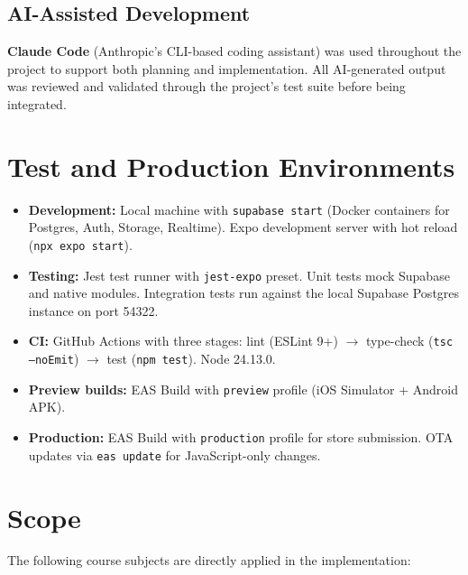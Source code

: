 \documentclass[12pt,a4paper]{report}
\renewcommand\_{\textunderscore\hspace{0pt}}
\begin{document}
\subsection{AI-Assisted Development}

\textbf{Claude Code} (Anthropic's CLI-based coding assistant) was used throughout the project to support both planning and implementation. All AI-generated output was reviewed and validated through the project's test suite before being integrated.

\section{Test and Production Environments}

\begin{itemize}[noitemsep]
    \item \textbf{Development:} Local machine with \texttt{supabase start} (Docker containers for Postgres, Auth, Storage, Realtime). Expo development server with hot reload (\texttt{npx expo start}).
    \item \textbf{Testing:} Jest test runner with \texttt{jest-expo} preset. Unit tests mock Supabase and native modules. Integration tests run against the local Supabase Postgres instance on port 54322.
    \item \textbf{CI:} GitHub Actions with three stages: lint (ESLint 9+) $\rightarrow$ type-check (\texttt{tsc --noEmit}) $\rightarrow$ test (\texttt{npm test}). Node 24.13.0.
    \item \textbf{Preview builds:} EAS Build with \texttt{preview} profile (iOS Simulator + Android APK).
    \item \textbf{Production:} EAS Build with \texttt{production} profile for store submission. OTA updates via \texttt{eas update} for JavaScript-only changes.
\end{itemize}

\section{Scope}

The following course subjects are directly applied in the implementation:
\end{document}
